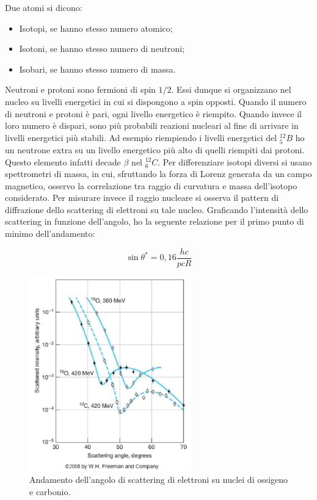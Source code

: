 Due atomi si dicono:

\begin{itemize}
\item Isotopi, se hanno stesso numero atomico;
\item Isotoni, se hanno stesso numero di neutroni;
\item Isobari, se hanno stesso numero di massa.
\end{itemize}

Neutroni e protoni sono fermioni di spin $1/2$. Essi dunque si organizzano nel nucleo su livelli energetici in cui si dispongono a spin opposti.
Quando il numero di neutroni e protoni è pari, ogni livello energetico è riempito. Quando invece il loro numero è dispari, sono più probabili reazioni nucleari al fine di arrivare in livelli energetici più stabili. Ad esempio riempiendo i livelli energetici del $^{12}_5B$ ho un neutrone extra su un livello energetico più alto di quelli riempiti dai protoni. Questo elemento infatti decade $\beta$ nel $^{12}_6C$.
Per differenziare isotopi diversi si usano spettrometri di massa, in cui, sfruttando la forza di Lorenz generata da un campo magnetico, osservo la correlazione tra raggio di curvatura e massa dell'isotopo considerato.
Per misurare invece il raggio nucleare si osserva il pattern di diffrazione dello scattering di elettroni su tale nucleo. Graficando l'intensità dello scattering in funzione dell'angolo, ho la seguente relazione per il primo punto di minimo dell'andamento:

\begin{equation}
\sin \theta^*=0,16\frac{hc}{pcR}
\end{equation}

\begin{figure}
\centering
		\includegraphics[width=7cm, keepaspectratio]{figs/scatteringatomicradius.png}
		\caption{Andamento dell'angolo di scattering di elettroni su nuclei di ossigeno e carbonio.}
         \label{scatteringatomicradius}
\end{figure}

